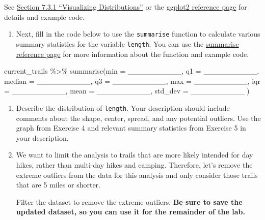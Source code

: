 \documentclass[
]{article}
\newenvironment{Shaded}{\begin{snugshade}}{\end{snugshade}}
\newcommand{\AttributeTok}[1]{\textcolor[rgb]{0.77,0.63,0.00}{#1}}
\newcommand{\FunctionTok}[1]{\textcolor[rgb]{0.00,0.00,0.00}{#1}}
\newcommand{\NormalTok}[1]{#1}
\newcommand{\SpecialCharTok}[1]{\textcolor[rgb]{0.00,0.00,0.00}{#1}}
\providecommand{\tightlist}{%
  \setlength{\itemsep}{0pt}\setlength{\parskip}{0pt}}
\begin{document}
See
\href{https://r4ds.had.co.nz/exploratory-data-analysis.html\#introduction-3}{Section
7.3.1 ``Visualizing Distributions''} or the
\href{https://ggplot2.tidyverse.org/reference/index.html}{ggplot2
reference page} for details and example code.

\begin{enumerate}
\def\labelenumi{\arabic{enumi}.}
\setcounter{enumi}{4}
\tightlist
\item
  Next, fill in the code below to use the \texttt{summarise} function to
  calculate various summary statistics for the variable \texttt{length}.
  You can use the
  \href{https://dplyr.tidyverse.org/reference/summarise.html}{summarise
  reference page} for more information about the function and example
  code.
\end{enumerate}

\begin{Shaded}
\begin{Highlighting}[]
\NormalTok{current\_trails }\SpecialCharTok{\%\textgreater{}\%}
  \FunctionTok{summarise}\NormalTok{(}\AttributeTok{min =}\NormalTok{ \_\_\_\_\_\_\_\_\_\_, }
            \AttributeTok{q1 =}\NormalTok{ \_\_\_\_\_\_\_\_\_\_, }
            \AttributeTok{median =}\NormalTok{ \_\_\_\_\_\_\_\_\_\_, }
            \AttributeTok{q3 =}\NormalTok{ \_\_\_\_\_\_\_\_\_\_, }
            \AttributeTok{max =}\NormalTok{ \_\_\_\_\_\_\_\_\_\_, }
            \AttributeTok{iqr =}\NormalTok{ \_\_\_\_\_\_\_\_\_\_, }
            \AttributeTok{mean =}\NormalTok{ \_\_\_\_\_\_\_\_\_\_, }
            \AttributeTok{std\_dev =}\NormalTok{ \_\_\_\_\_\_\_\_\_\_}
\NormalTok{            )}
\end{Highlighting}
\end{Shaded}

\begin{enumerate}
\def\labelenumi{\arabic{enumi}.}
\setcounter{enumi}{5}
\item
  Describe the distribution of \texttt{length}. Your description should
  include comments about the shape, center, spread, and any potential
  outliers. Use the graph from Exercise 4 and relevant summary
  statistics from Exercise 5 in your description.
\item
  We want to limit the analysis to trails that are more likely intended
  for day hikes, rather than multi-day hikes and camping. Therefore,
  let's remove the extreme outliers from the data for this analysis and
  only consider those trails that are 5 miles or shorter.

  Filter the dataset to remove the extreme outliers. \textbf{Be sure to
  save the updated dataset, so you can use it for the remainder of the
  lab.}
\end{enumerate}
\end{document}
